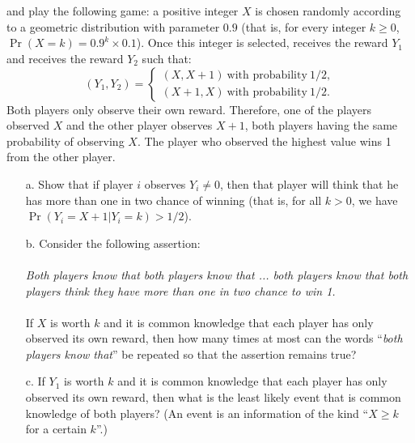 \documentclass{../ape}
\newcommand{\X}{X}
\newcommand{\Y}{Y}
\begin{document}
\section{}
\TAone{} and \TAtwo{} play the following game: a positive integer $\X$ is chosen randomly according to a geometric distribution with parameter $0.9$ (that is, for every integer $k \geq 0$, $\Pr(\X = k) = 0.9 ^ k \times 0.1$). Once this integer is selected, \TAone{} receives the reward $\Y_1$ and \TAtwo{} receives the reward $\Y_2$ such that:
\begin{equation*}
	(\Y_1, \Y_2) = 
	\begin{cases}
		(\X, \X+1) \ \text{with probability} \ 1/2, \\
		(\X+1, \X) \ \text{with probability} \ 1/2.
	\end{cases}
\end{equation*}
Both players only observe their own reward. Therefore, one of the players observed $\X$ and the other player observes $\X + 1$, both players having the same probability of observing $\X$. The player who observed the highest value wins \SI{1}{\EUR} from the other player.
\begin{itemize}
	\item[a.] Show that if player $i$ observes $\Y_i \neq 0$, then that player will think that he has more than one in two chance of winning (that is, for all $k > 0$, we have $\Pr(\Y_i = \X+1 | \Y_i = k) > 1/2$).
	\item[b.] Consider the following assertion: \\
	\\
      \textit{Both players know that both players know that ... both players know that both players think they have more than one in two chance to win \SI{1}{\EUR}.} \\
	\\
	If $\X$ is worth $k$ and it is common knowledge that each player has only observed its own reward, then how many times at most can the words ``\textit{both players know that}'' be repeated so that the assertion remains true?
	\item[c.] If $\Y_1$ is worth $k$ and it is common knowledge that each player has only observed its own reward, then what is the least likely event that is common knowledge of both players? (An event is an information of the kind ``$\X \geq k$ for a certain $k$''.)
\end{itemize}
\begin{solution}

\end{solution}
\end{document}
